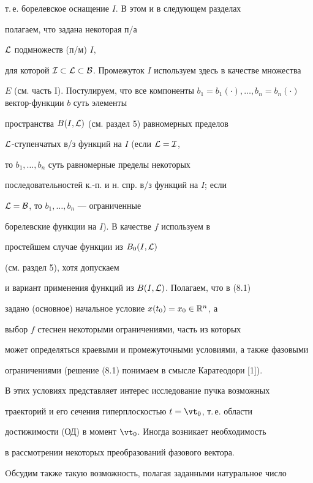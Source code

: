 т.\,е. борелевское оснащение $I$. В этом и в следующем разделах


полагаем, что задана некоторая п/а


${\cal L}$ подмножеств (п/м) $I$,


для которой ${\cal I} \subset {\cal L} \subset


{\cal B}$. Промежуток $I$ используем здесь в качестве множества


$E$ (см. часть I). Постулируем, что все компоненты ${b_1} = {{b_1}(\cdot)},


\dotsc,{b_n} = {{b_n}(\cdot)}$ вектор-функции $b$ суть элементы


пространства $B(I,{\cal L})$ (см. раздел 5) равномерных пределов


${\cal L}$-ступенчатых в/з функций на $I$ (если ${\cal L} = {\cal I}$,


то ${b_1},\dotsc,{b_n}$ суть равномерные пределы некоторых


последовательностей к.-п. и н. спр. в/з функций на $I$; если


${\cal L} = {\cal B}$, то ${b_1},\dotsc,{b_n}$ --- ограниченные


борелевские функции на $I$). В качестве $f$ используем в


простейшем случае функции из ${B_0}(I,{\cal L})$


(см. раздел 5), хотя допускаем


и вариант применения функций из $B(I,{\cal L})$. Полагаем, что в (8.1)


задано (основное) начальное условие ${x(t_0)} = {x_0} \in


{{\Bbb R}^n}$, а


выбор $f$ стеснен некоторыми ограничениями, часть из которых


может определяться краевыми и промежуточными условиями, а также фазовыми


ограничениями (решение (8.1) понимаем в смысле Каратеодори [1]).


В этих условиях представляет интерес исследование пучка возможных


траекторий и его сечения гиперплоскостью $t = {{\vt}_0}$, т.\,е. области


достижимости (ОД) в момент ${{\vt}_0}$. Иногда возникает необходимость


в рассмотрении некоторых преобразований фазового вектора.


Oбсудим также такую возможность, полагая заданными натуральное число



